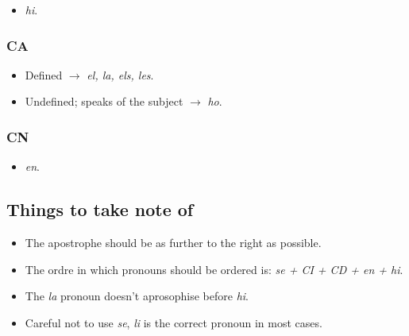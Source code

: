 \documentclass{article}
\begin{document}
\begin{itemize}
    \item \emph{hi}.
\end{itemize}

\subsubsection*{CA}

\begin{itemize}
    \item Defined $\rightarrow$ \emph{el, la, els, les}.
    \item Undefined; speaks of the subject $\rightarrow$ \emph{ho}.
\end{itemize}

\subsubsection*{CN}

\begin{itemize}
    \item \emph{en}.
\end{itemize}

\subsection*{Things to take note of}

\begin{itemize}
    \item The apostrophe should be as further to the right as possible.
    \item The ordre in which pronouns should be ordered is: \emph{se + CI + CD +
    en + hi}.
    \item The \emph{la} pronoun doesn't aprosophise before \emph{hi}.
    \item Careful not to use \emph{se}, \emph{li} is the correct pronoun in most
    cases.
\end{itemize}
\end{document}
